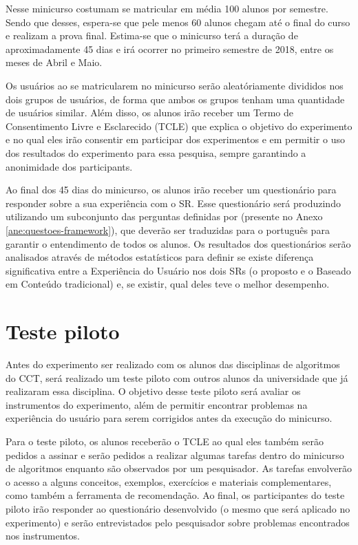 Nesse minicurso costumam se matricular em média 100 alunos por semestre. Sendo que desses, espera-se que pele menos 60 alunos chegam até
o final do curso e realizam a prova final. Estima-se que o minicurso terá a duração de aproximadamente 45 dias e irá ocorrer no primeiro semestre
de 2018, entre os meses de Abril e Maio.

Os usuários ao se matricularem no minicurso serão aleatóriamente divididos nos dois grupos de usuários, de forma que ambos
os grupos tenham uma quantidade de usuários similar. Além disso, os alunos irão receber um Termo de Consentimento Livre
e Esclarecido (TCLE) que explica o objetivo do experimento e no qual eles irão consentir em participar dos experimentos e
em permitir o uso dos resultados do experimento para essa pesquisa, sempre garantindo a anonimidade dos participants.

Ao final dos 45 dias do minicurso, os alunos irão receber um questionário para responder sobre a sua experiência com o SR.
Esse questionário será produzindo utilizando um subconjunto das perguntas definidas por  (presente no
Anexo \ref{ane:questoes-framework}), que deverão ser traduzidas para o português para garantir o entendimento de todos os alunos.
Os resultados dos questionários serão  analisados através de métodos estatísticos para definir se existe diferença
significativa entre a Experiência do Usuário nos dois SRs (o proposto e o Baseado em Conteúdo tradicional) e, se existir,
qual deles teve o melhor desempenho.

\section{Teste piloto}

Antes do experimento ser realizado com os alunos das disciplinas de algoritmos do CCT, será realizado um teste piloto com
outros alunos da universidade que já realizaram essa disciplina. O objetivo desse teste piloto será avaliar os
instrumentos do experimento, além de permitir encontrar problemas na experiência do  usuário para serem corrigidos
antes da execução do minicurso.

Para o teste piloto, os alunos receberão o TCLE ao qual eles também serão pedidos a assinar e serão pedidos a realizar algumas
tarefas dentro do minicurso de algoritmos enquanto são observados por um pesquisador. As tarefas envolverão o acesso a
alguns conceitos, exemplos, exercícios e materiais complementares, como também a ferramenta de recomendação. Ao final, os
participantes do teste piloto irão responder ao questionário desenvolvido (o mesmo que será aplicado no experimento) e
serão entrevistados pelo pesquisador sobre problemas encontrados nos instrumentos.

